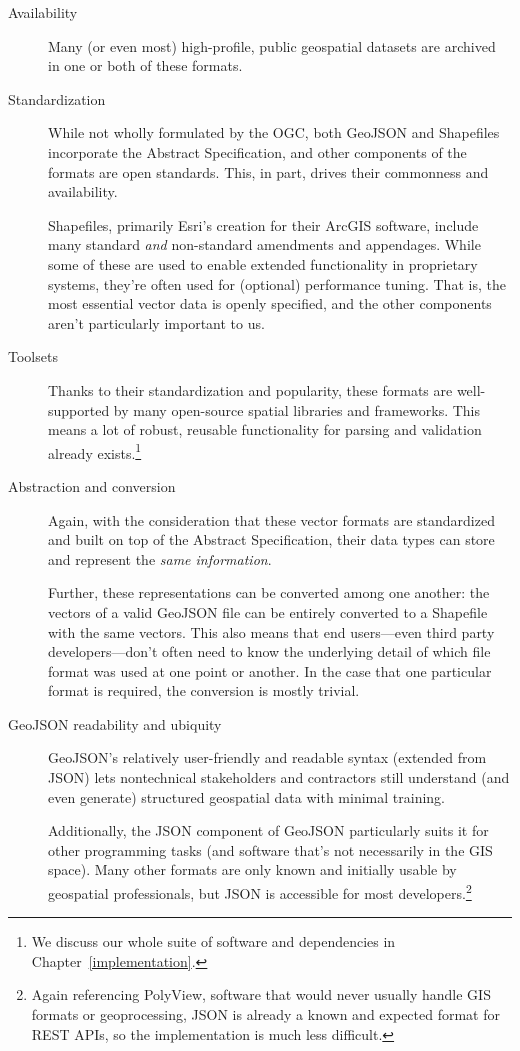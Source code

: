 \begin{description}
  \item[Availability] Many (or even most) high-profile, public geospatial datasets are archived in one or both of these formats.
  \item[Standardization] While not wholly formulated by the OGC, both GeoJSON and Shapefiles incorporate the Abstract Specification, and other components of the formats are open standards. This, in part, drives their commonness and availability.
  
Shapefiles, primarily Esri's creation for their ArcGIS software, include many standard \textit{and} non-standard amendments and appendages. While some of these are used to enable extended functionality in proprietary systems, they're often used for (optional) performance tuning. That is, the most essential vector data is openly specified, and the other components aren't particularly important to us.

\item[Toolsets] Thanks to their standardization and popularity, these formats  are well-supported by many open-source spatial libraries and frameworks. This means a lot of robust, reusable functionality for parsing and validation already exists.\footnote{We discuss our whole suite of software and dependencies in Chapter~\ref{implementation}.}

\item[Abstraction and conversion] Again, with the consideration that these vector formats are standardized and built on top of the Abstract Specification, their data types can store and represent the \textit{same information}.

Further, these representations can be converted among one another: the vectors of a valid GeoJSON file can be entirely converted to a Shapefile with the same vectors. This also means that end users---even third party developers---don't often need to know the underlying detail of which file format was used at one point or another. In the case that one particular format is required, the conversion is mostly trivial.

\item[GeoJSON readability and ubiquity] GeoJSON's relatively user-friendly and readable syntax (extended from JSON) lets nontechnical stakeholders and contractors still understand (and even generate) structured geospatial data with minimal training.

Additionally, the JSON component of GeoJSON particularly suits it for other programming tasks (and software that's not necessarily in the GIS space). Many other formats are only known and initially usable by geospatial professionals, but JSON is accessible for most developers.\footnote{Again referencing PolyView, software that would never usually handle GIS formats or geoprocessing, JSON is already a known and expected format for REST APIs, so the implementation is much less difficult.}

\end{description}

